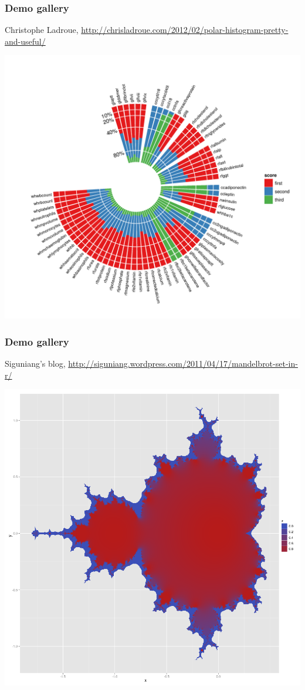 \documentclass[compress]{beamer}\usepackage[]{graphicx}\usepackage[]{color}
\begin{document}
\begin{frame}[fragile]
\frametitle{Demo gallery}
Christophe Ladroue, \footnotesize{\url{http://chrisladroue.com/2012/02/polar-histogram-pretty-and-useful/}}
\begin{center}
  \includegraphics[height=.6\textheight]{images/cool3.png}
\end{center}
\end{frame}

\begin{frame}[fragile]
\frametitle{Demo gallery}
Siguniang's blog, \footnotesize{\url{http://siguniang.wordpress.com/2011/04/17/mandelbrot-set-in-r/}}
\begin{center}
  \includegraphics[height=.6\textheight]{images/cool4.png}
\end{center}
\end{frame}
\end{document}
